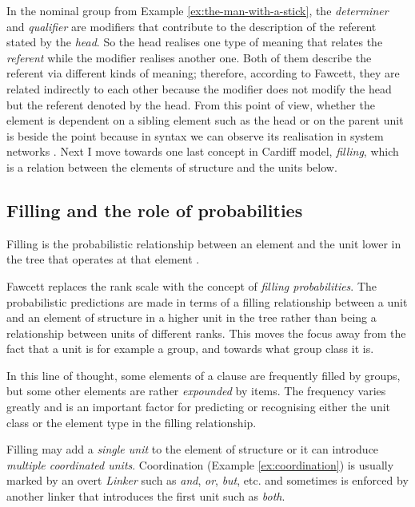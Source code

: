 In the nominal group from Example \ref{ex:the-man-with-a-stick}, the \textit{determiner} and \textit{qualifier} are modifiers that contribute to the description of the referent stated by the \textit{head}. So the head realises one type of meaning that relates the \textit{referent} while the modifier realises another one. Both of them describe the referent via different kinds of meaning; therefore, according to Fawcett, they are related indirectly to each other because the modifier does not modify the head but the referent denoted by the head. From this point of view, whether the element is dependent on a sibling element such as the head or on the parent unit is beside the point because in syntax we can observe its realisation in system networks \citep[216--217]{Fawcett2000}.
Next I move towards one last concept in Cardiff model, \textit{filling}, which is a relation between the elements of structure and the units below.

\subsection{Filling and the role of probabilities}
\begin{definition}[Filling]\label{def:filling}
    Filling is the probabilistic relationship between an element and the unit lower in the tree that operates at that element \citep[238, 251]{Fawcett2000}. 
\end{definition}

Fawcett replaces the rank scale with the concept of \textit{filling probabilities}. The probabilistic predictions are made in terms of a filling relationship between a unit and an element of structure in a higher unit in the tree rather than being a relationship between units of different ranks. This moves the focus away from the fact that a unit is for example a group, and towards what group class it is. 

In this line of thought, some elements of a clause are frequently filled by groups, but some other elements are rather \textit{expounded} by items. The frequency varies greatly and is an important factor for predicting or recognising either the unit class or the element type in the filling relationship. 

Filling may add a \textit{single unit} to the element of structure or it can introduce \textit{multiple coordinated units}. Coordination (Example \ref{ex:coordination}) is usually marked by an overt \textit{Linker} such as \textit{and}, \textit{or}, \textit{but}, etc. and sometimes is enforced by another linker that introduces the first unit such as \textit{both}.

